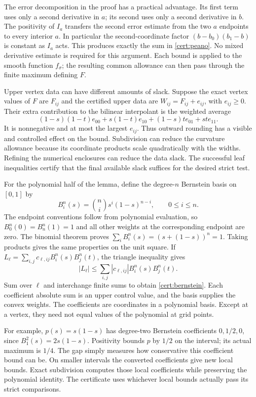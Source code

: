 The error decomposition in the proof has a practical advantage. Its
first term uses only a second derivative in $a$; its second uses only
a second derivative in $b$. The positivity of $I_a$ transfers the
second error estimate from the two $a$ endpoints to every interior
$a$. In particular the second-coordinate factor
$(b-b_0)(b_1-b)$ is constant as $I_a$ acts. This produces exactly
the sum in \eqref{cert:peano}. No mixed derivative estimate is
required for this argument. Each bound is applied to the smooth
function $f_\sigma$; the resulting common allowance can then pass
through the finite maximum defining $F$.

Upper vertex data can have different amounts of slack. Suppose the
exact vertex values of $F$ are $F_{ij}$ and the certified upper data
are $W_{ij}=F_{ij}+e_{ij}$, with $e_{ij}\geq0$. Their extra contribution
to the bilinear interpolant is the weighted average
\[
 (1-s)(1-t)e_{00}+s(1-t)e_{10}+(1-s)te_{01}+ste_{11}.
\]
It is nonnegative and at most the largest $e_{ij}$. Thus outward
rounding has a visible and controlled effect on the bound. Subdivision
can reduce the curvature allowance because its coordinate products
scale quadratically with the widths. Refining the numerical enclosures
can reduce the data slack. The successful leaf inequalities certify
that the final available slack suffices for the desired strict test.

For the polynomial half of the lemma, define the degree-$n$ Bernstein
basis on $[0,1]$ by
\[
 B_i^n(s)=\binom ni s^i(1-s)^{n-i},\qquad 0\leq i\leq n.
\]
The endpoint conventions follow from polynomial evaluation, so
$B_0^n(0)=B_n^n(1)=1$ and all other weights at the corresponding
endpoint are zero. The binomial theorem proves
$\sum_iB_i^n(s)=(s+(1-s))^n=1$. Taking products gives the same
properties on the unit square. If
$L_\ell=\sum_{i,j}c_{\ell,ij}B_i^n(s)B_j^n(t)$, the triangle
inequality gives
\[
 |L_\ell|\leq\sum_{i,j}|c_{\ell,ij}|B_i^n(s)B_j^n(t).
\]
Sum over $\ell$ and interchange finite sums to obtain
\eqref{cert:bernstein}. Each coefficient absolute sum is an upper
control value, and the basis supplies the convex weights. The
coefficients are coordinates in a polynomial basis. Except at a
vertex, they need not equal values of the polynomial at grid points.

For example, $p(s)=s(1-s)$ has degree-two Bernstein coefficients
$0,1/2,0$, since $B_1^2(s)=2s(1-s)$. Positivity bounds $p$ by
$1/2$ on the interval; its actual maximum is $1/4$. The gap simply
measures how conservative this coefficient bound can be. On smaller
intervals the converted coefficients give new local bounds. Exact
subdivision computes those local coefficients while preserving the
polynomial identity. The certificate uses whichever local bounds
actually pass its strict comparisons.

